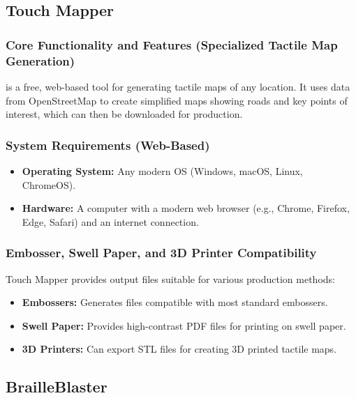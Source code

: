 \subsection{Touch Mapper}\label{ch14:ssec:touch-mapper}
\subsubsection{Core Functionality and Features (Specialized Tactile Map Generation)}\label{ch14:sssec:touch-mapper-features}
 is a free, web-based tool for generating tactile maps of any location. It uses data from OpenStreetMap to create simplified maps showing roads and key points of interest, which can then be downloaded for production.

\subsubsection{System Requirements (Web-Based)}\label{ch14:sssec:touch-mapper-sysreq}
\begin{itemize}
	\item \textbf{Operating System:} Any modern OS (Windows, macOS, Linux, ChromeOS).
	\item \textbf{Hardware:} A computer with a modern web browser (e.g., Chrome, Firefox, Edge, Safari) and an internet connection.
\end{itemize}

\subsubsection{Embosser, Swell Paper, and 3D Printer Compatibility}\label{ch14:sssec:touch-mapper-compat}
Touch Mapper provides output files suitable for various production methods:
\begin{itemize}
	\item \textbf{Embossers:} Generates files compatible with most standard embossers.
	\item \textbf{Swell Paper:} Provides high-contrast PDF files for printing on swell paper.
	\item \textbf{3D Printers:} Can export STL files for creating 3D printed tactile maps.
\end{itemize}

\subsection{BrailleBlaster}\label{ch14:ssec:brailleblaster}
